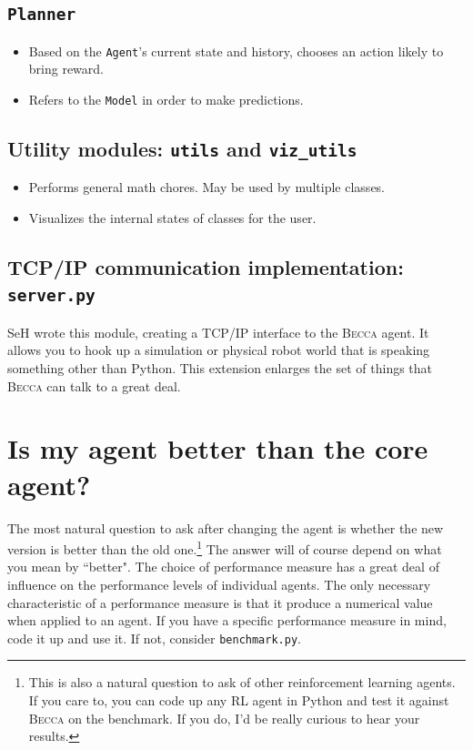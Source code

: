 \subsection{\texttt{Planner}}
\begin{itemize}
\item Based on the \texttt{Agent}'s current state and history, chooses an action likely to bring reward.
\item Refers to the \texttt{Model} in order to make predictions.
\end{itemize}

\subsection{Utility modules: \texttt{utils} and \texttt{viz\_utils}}
\begin{itemize}
\item Performs general math chores. May be used by multiple classes.
\item Visualizes the internal states of classes for the user.
\end{itemize}

\subsection{TCP/IP communication implementation: \texttt{server.py}}
SeH wrote this module, creating a TCP/IP interface to the \textsc{Becca} agent. It allows you to hook up a simulation or physical robot world that is speaking something other than Python. This extension enlarges the set of things that \textsc{Becca} can talk to a great deal.

\section{Is my agent better than the core agent?}
The most natural question to ask after changing the agent is whether the new version is better than the old one.\footnote{This is also a natural question to ask of other reinforcement learning agents. If you care to, you can code up any RL agent in Python and test it against \textsc{Becca} on the benchmark. If you do, I'd be really curious to hear your results.} The answer will of course depend on what you mean by ``better". The choice of performance measure has a great deal of influence on the performance levels of individual agents. The only necessary characteristic of a performance measure is that it produce a numerical value when applied to an agent. If you have a specific performance measure in mind, code it up and use it. If not, consider \texttt{benchmark.py}. 

